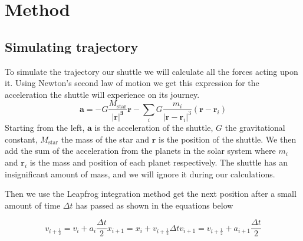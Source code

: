 \documentclass[reprint,english,notitlepage]{revtex4-2}
\begin{document}
\section{Method} \label{sec: method}
\subsection{Simulating trajectory} \label{ssec: simulating trajectory}
To simulate the trajectory our shuttle we will calculate all the forces acting upon it.
Using Newton's second law of motion we get this expression for the acceleration the shuttle will experience on its journey.
\[
\mathbf{a} = - G \frac{M_{\text{star}}}{\mathbf{\left\vert \mathbf{r} \right\vert ^{3}}} \mathbf{r} - \sum_{i} G \frac{m_i}{\left\vert \mathbf{r} - \mathbf{r}_i \right\vert ^{3}} \left( \mathbf{r} - \mathbf{r}_i \right)
\]
Starting from the left, $ \mathbf{a} $ is the acceleration of the shuttle, $ G $ the gravitational constant, $ M_{\text{star}} $ the mass of the star and $ \mathbf{r} $ is the position of the shuttle.
We then add the sum of the acceleration from the planets in the solar system where $ m_i $ and $ \mathbf{r}_i $ is the mass and position of each planet respectively.
The shuttle has an insignificant amount of mass, and we will ignore it during our calculations.

Then we use the Leapfrog integration method get the next position after a small amount of time $ \Delta t $ has passed as shown in the equations below

\begin{subequations} \label{eq: leapfrog integration}
    \begin{equation}
        v_{i + \frac{1}{2}} = v_i + a_i \frac{Δt }{2}
    \end{equation}
    \begin{equation}
      x_{i+1} = x_{i} + v_{i + \frac{1}{2}} Δt
    \end{equation}
    \begin{equation}
      v_{i+1} = v_{i + \frac{1}{2}} + a_{i+1} \frac{Δt }{2}
    \end{equation}
\end{subequations}
\end{document}
